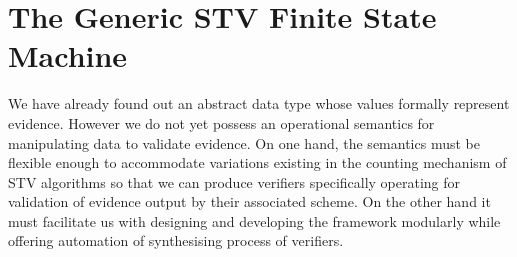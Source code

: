 \documentclass[10pt,conference]{IEEEtran}
\begin{document}
\section{The Generic STV Finite State Machine}
\label{sec:Machine}
\setlength{\abovedisplayskip}{0.5em}
\setlength{\belowdisplayskip}{0.5em}
We have already found out an abstract data type whose values  formally represent evidence. However we do not yet possess an operational semantics for manipulating data to validate evidence.   On one hand, the semantics must be flexible enough to accommodate variations existing in the counting mechanism of STV algorithms so that we can produce verifiers  specifically operating for validation of evidence output by their associated scheme. On the other hand it must facilitate us with designing and developing the framework modularly while offering automation of synthesising process of verifiers.



\end{document}
